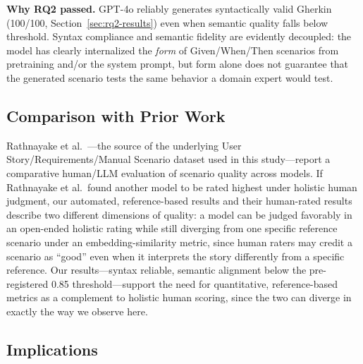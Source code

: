 \textbf{Why RQ2 passed.}
GPT-4o reliably generates syntactically valid Gherkin (100/100, Section~\ref{sec:rq2-results}) even when semantic quality falls below threshold.
Syntax compliance and semantic fidelity are evidently decoupled: the model has clearly internalized the \emph{form} of Given/When/Then scenarios from pretraining and/or the system prompt, but form alone does not guarantee that the generated scenario tests the same behavior a domain expert would test.

\subsection{Comparison with Prior Work}
\label{sec:prior-work}

Rathnayake et al.~\cite{rathnayake2026llm}---the source of the underlying User Story/Requirements/Manual Scenario dataset used in this study---report a comparative human/LLM evaluation of scenario quality across models.
%
%
If Rathnayake et al.\ found another model to be rated highest under holistic human judgment, our automated, reference-based results and their human-rated results describe two different dimensions of quality: a model can be judged favorably in an open-ended holistic rating while still diverging from one specific reference scenario under an embedding-similarity metric, since human raters may credit a scenario as ``good'' even when it interprets the story differently from a specific reference.
Our results---syntax reliable, semantic alignment below the pre-registered 0.85 threshold---support the need for quantitative, reference-based metrics as a complement to holistic human scoring, since the two can diverge in exactly the way we observe here.

\subsection{Implications}
\label{sec:implications}

